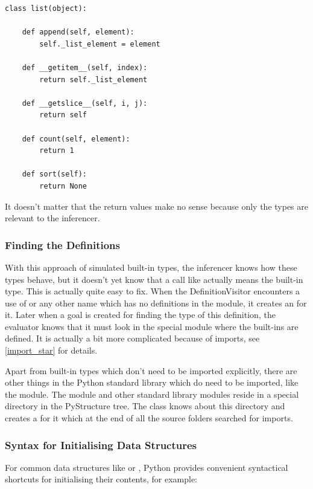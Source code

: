 \documentclass[12pt,halfparskip,DIV11,BCOR10mm]{scrreprt}
\begin{document}
\begin{lstlisting}
class list(object):

    def append(self, element):
        self._list_element = element

    def __getitem__(self, index):
        return self._list_element

    def __getslice__(self, i, j):
        return self

    def count(self, element):
        return 1

    def sort(self):
        return None
\end{lstlisting}

It doesn't matter that the return values make no sense because only the types are relevant to the inferencer.

\subsubsection{Finding the Definitions}

With this approach of simulated built-in types, the inferencer knows how these types behave, but it doesn't yet know that a call like  actually means the built-in type. This is actually quite easy to fix. When the DefinitionVisitor encounters a use of  or any other name which has no definitions in the module, it creates an  for it. Later when a goal is created for finding the type of this definition, the evaluator knows that it must look in the special module  where the built-ins are defined. It is actually a bit more complicated because of  imports, see \vref{import_star} for details.

Apart from built-in types which don't need to be imported explicitly, there are other things in the Python standard library which do need to be imported, like the  module. The  module and other standard library modules reside in a special directory in the PyStructure tree. The  class knows about this directory and creates a  for it which at the end of all the source folders searched for imports.


\subsubsection{Syntax for Initialising Data Structures}

For common data structures like  or , Python provides convenient syntactical shortcuts for initialising their contents, for example:
\end{document}
